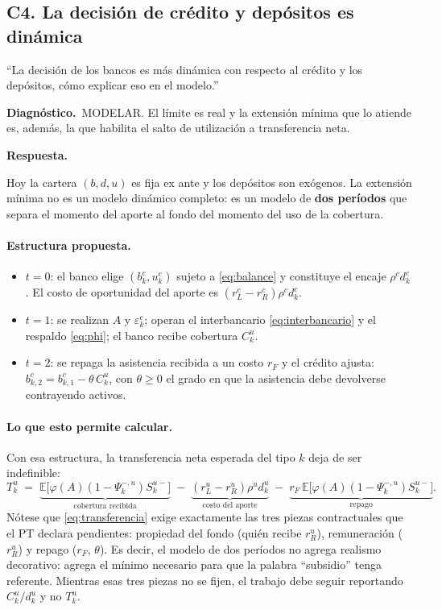 \documentclass[11pt]{article}
\newcommand{\diag}[1]{\par\noindent\textbf{Diagn\'ostico.}\ #1\par}
\newcommand{\resp}{\par\noindent\textbf{Respuesta.}\par}
\newcommand{\E}{\mathbb{E}}
\theoremstyle{definition}
\begin{document}
\subsection{C4. La decisi\'on de cr\'edito y dep\'ositos es din\'amica}
\label{sub:C4}

\begin{jurado}
``La decisi\'on de los bancos es m\'as din\'amica con respecto al cr\'edito y los
dep\'ositos, c\'omo explicar eso en el modelo.''
\end{jurado}

\diag{MODELAR. El l\'imite es real y la extensi\'on m\'inima que lo atiende es,
adem\'as, la que habilita el salto de utilizaci\'on a transferencia neta.}

\resp
Hoy la cartera $(b,d,u)$ es fija ex ante y los dep\'ositos son exógenos. La
extensi\'on m\'inima no es un modelo din\'amico completo: es un modelo de
\textbf{dos per\'iodos} que separa el momento del aporte al fondo del momento del
uso de la cobertura.

\paragraph{Estructura propuesta.}
\begin{itemize}[leftmargin=*,itemsep=1pt]
\item $t=0$: el banco elige $(b^c_k,u^c_k)$ sujeto a \eqref{eq:balance} y
constituye el encaje $\rho^c d^c_k$. El costo de oportunidad del aporte es
$(r^c_L-r^c_R)\rho^c d^c_k$.
\item $t=1$: se realizan $A$ y $\varepsilon^c_k$; operan el interbancario
\eqref{eq:interbancario} y el respaldo \eqref{eq:phi}; el banco recibe
cobertura $C^u_k$.
\item $t=2$: se repaga la asistencia recibida a un costo $r_F$ y el cr\'edito
ajusta: $b^c_{k,2}=b^c_{k,1}-\theta\,C^u_k$, con $\theta\ge0$ el grado en que la
asistencia debe devolverse contrayendo activos.
\end{itemize}

\paragraph{Lo que esto permite calcular.} Con esa estructura, la transferencia
neta esperada del tipo $k$ deja de ser indefinible:
\begin{equation}
T^u_k \;=\; \underbrace{\E\big[\varphi(A)(1-\Psi^{-,u}_k)S^{u-}_k\big]}_{\text{cobertura recibida}}
\;-\;\underbrace{(r^u_L-r^u_R)\rho^u d^u_k}_{\text{costo del aporte}}
\;-\;\underbrace{r_F\,\E\big[\varphi(A)(1-\Psi^{-,u}_k)S^{u-}_k\big]}_{\text{repago}}.
\label{eq:transferencia}
\end{equation}
N\'otese que \eqref{eq:transferencia} exige exactamente las tres piezas
contractuales que el PT declara pendientes: propiedad del fondo (qui\'en recibe
$r^u_R$), remuneraci\'on ($r^u_R$) y repago ($r_F$, $\theta$). Es decir, el
modelo de dos per\'iodos no agrega realismo decorativo: agrega el m\'inimo
necesario para que la palabra ``subsidio'' tenga referente. Mientras esas tres
piezas no se fijen, el trabajo debe seguir reportando $C^u_k/d^u_k$ y no $T^u_k$.
\end{document}
